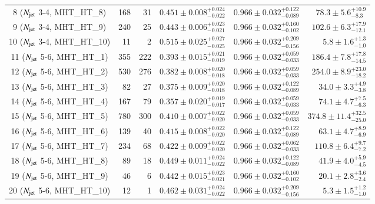 \begin{table}[h]
\begin{tabular}{|c|rr|c|c|r|}
 8 ($N_{\rm jet}$ 3-4, MHT\_HT\_8)    &  168 &    31 & $0.451\pm0.008^{+0.024}_{-0.022}$ & $0.966\pm0.032^{+0.122}_{-0.089}$ & $  78.3\pm 5.6^{+10.9}_{- 8.3}$ \\      
 9 ($N_{\rm jet}$ 3-4, MHT\_HT\_9)    &  240 &    25 & $0.443\pm0.006^{+0.023}_{-0.021}$ & $0.966\pm0.032^{+0.160}_{-0.102}$ & $ 102.6\pm 6.3^{+17.9}_{-12.1}$ \\      
 10 ($N_{\rm jet}$ 3-4, MHT\_HT\_10)  &   11 &     2 & $0.515\pm0.025^{+0.027}_{-0.025}$ & $0.966\pm0.032^{+0.209}_{-0.156}$ & $   5.8\pm 1.6^{+ 1.3}_{- 1.0}$ \\      
\hline                                 															      
 11 ($N_{\rm jet}$ 5-6, MHT\_HT\_1)   &  355 &   222 & $0.393\pm0.015^{+0.021}_{-0.019}$ & $0.966\pm0.032^{+0.059}_{-0.033}$ & $ 186.4\pm 7.8^{+17.8}_{-14.5}$ \\      
 12 ($N_{\rm jet}$ 5-6, MHT\_HT\_2)   &  530 &   276 & $0.382\pm0.008^{+0.020}_{-0.018}$ & $0.966\pm0.032^{+0.059}_{-0.033}$ & $ 254.0\pm 8.9^{+23.0}_{-18.2}$ \\      
 13 ($N_{\rm jet}$ 5-6, MHT\_HT\_3)   &   82 &    27 & $0.375\pm0.009^{+0.020}_{-0.018}$ & $0.966\pm0.032^{+0.122}_{-0.089}$ & $  34.0\pm 3.3^{+ 4.9}_{- 3.8}$ \\      
 14 ($N_{\rm jet}$ 5-6, MHT\_HT\_4)   &  167 &    79 & $0.357\pm0.020^{+0.019}_{-0.017}$ & $0.966\pm0.032^{+0.059}_{-0.033}$ & $  74.1\pm 4.7^{+ 7.5}_{- 6.3}$ \\      
 15 ($N_{\rm jet}$ 5-6, MHT\_HT\_5)   &  780 &   300 & $0.410\pm0.007^{+0.022}_{-0.020}$ & $0.966\pm0.032^{+0.059}_{-0.033}$ & $ 374.8\pm11.4^{+32.5}_{-25.0}$ \\      
 16 ($N_{\rm jet}$ 5-6, MHT\_HT\_6)   &  139 &    40 & $0.415\pm0.008^{+0.022}_{-0.020}$ & $0.966\pm0.032^{+0.122}_{-0.089}$ & $  63.1\pm 4.7^{+ 8.9}_{- 6.9}$ \\      
 17 ($N_{\rm jet}$ 5-6, MHT\_HT\_7)   &  234 &    68 & $0.422\pm0.009^{+0.022}_{-0.020}$ & $0.966\pm0.032^{+0.062}_{-0.033}$ & $ 110.8\pm 6.4^{+ 9.7}_{- 7.2}$ \\      
 18 ($N_{\rm jet}$ 5-6, MHT\_HT\_8)   &   89 &    18 & $0.449\pm0.011^{+0.024}_{-0.022}$ & $0.966\pm0.032^{+0.122}_{-0.089}$ & $  41.9\pm 4.0^{+ 5.9}_{- 4.5}$ \\      
 19 ($N_{\rm jet}$ 5-6, MHT\_HT\_9)   &   46 &     6 & $0.442\pm0.015^{+0.023}_{-0.021}$ & $0.966\pm0.032^{+0.160}_{-0.102}$ & $  20.1\pm 2.8^{+ 3.6}_{- 2.4}$ \\      
 20 ($N_{\rm jet}$ 5-6, MHT\_HT\_10)  &   12 &     1 & $0.462\pm0.031^{+0.024}_{-0.022}$ & $0.966\pm0.032^{+0.209}_{-0.156}$ & $   5.3\pm 1.5^{+ 1.2}_{- 1.0}$ \\      

\end{tabular}
\end{table}
